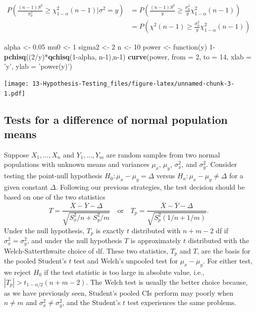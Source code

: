 \documentclass[]{book}
\newenvironment{Shaded}{\begin{snugshade}}{\end{snugshade}}
\newcommand{\KeywordTok}[1]{\textcolor[rgb]{0.13,0.29,0.53}{\textbf{{#1}}}}
\newcommand{\DataTypeTok}[1]{\textcolor[rgb]{0.13,0.29,0.53}{{#1}}}
\newcommand{\DecValTok}[1]{\textcolor[rgb]{0.00,0.00,0.81}{{#1}}}
\newcommand{\FloatTok}[1]{\textcolor[rgb]{0.00,0.00,0.81}{{#1}}}
\newcommand{\StringTok}[1]{\textcolor[rgb]{0.31,0.60,0.02}{{#1}}}
\newcommand{\NormalTok}[1]{{#1}}
\begin{document}
\begin{align*}
P\left(\frac{(n-1)S^2}{\sigma_0^2} \geq  \chi^2_{1-\alpha}(n-1)|\sigma^2 = y\right) & = P\left(\frac{(n-1)S^2}{y} \geq  \frac{\sigma_0^2}{y}\chi^2_{1-\alpha}(n-1)\right)\\
& = P\left(\chi^2(n-1) \geq  \frac{\sigma_0^2}{y}\chi^2_{1-\alpha}(n-1)\right)
\end{align*}

\begin{Shaded}
\begin{Highlighting}[]
\NormalTok{alpha <-}\StringTok{ }\FloatTok{0.05}
\NormalTok{mu0 <-}\StringTok{ }\DecValTok{1}
\NormalTok{sigma2 <-}\StringTok{ }\DecValTok{2}
\NormalTok{n <-}\StringTok{ }\DecValTok{10}
\NormalTok{power <-}\StringTok{ }\NormalTok{function(y)  }\DecValTok{1}\NormalTok{-}\KeywordTok{pchisq}\NormalTok{((}\DecValTok{2}\NormalTok{/y)*}\KeywordTok{qchisq}\NormalTok{(}\DecValTok{1}\NormalTok{-alpha, n}\DecValTok{-1}\NormalTok{),n}\DecValTok{-1}\NormalTok{)}
\KeywordTok{curve}\NormalTok{(power, }\DataTypeTok{from =} \DecValTok{2}\NormalTok{, }\DataTypeTok{to =} \DecValTok{14}\NormalTok{, }\DataTypeTok{xlab =} \StringTok{'y'}\NormalTok{, }\DataTypeTok{ylab =} \StringTok{'power(y)'}\NormalTok{)  }
\end{Highlighting}
\end{Shaded}

\texttt{[image: 13-Hypothesis-Testing\_files/figure-latex/unnamed-chunk-3-1.pdf]}

\subsection{Tests for a difference of normal population
means}\label{tests-for-a-difference-of-normal-population-means}

Suppose \(X_1, \ldots, X_n\) and \(Y_1, \ldots, Y_m\) are random samples
from two normal populations with unknown means and variances \(\mu_x\),
\(\mu_y\), \(\sigma_x^2\), and \(\sigma_y^2\). Consider testing the
point-null hypothesis \(H_0:\mu_x - \mu_y = \Delta\) versus
\(H_a:\mu_x - \mu_y \ne \Delta\) for a given constant \(\Delta\).
Following our previous strategies, the test decision should be based on
one of the two statistics
\[T = \frac{\overline X - \overline Y - \Delta}{\sqrt{S_x^2/n + S_y^2/m}} \quad \text{or}\quad T_p = \frac{\overline X - \overline Y - \Delta}{\sqrt{S_p^2\left(1/n+1/m\right)}}.\]
Under the null hypothesis, \(T_p\) is exactly \(t\) distributed with
\(n+m-2\) df if \(\sigma_x^2 = \sigma_y^2\), and under the null
hypothesis \(T\) is approximately \(t\) distributed with the
Welch-Satterthwaite choice of df. These two statistics, \(T_p\) and
\(T\), are the basis for the pooled Student's \(t\) test and Welch's
unpooled test for \(\mu_x - \mu_y\). For either test, we reject \(H_0\)
if the test statistic is too large in absolute value, i.e.,
\(|T_p|>t_{1-\alpha/2}(n+m-2)\). The Welch test is usually the better
choice because, as we have previously seen, Student's pooled CIs perform
may poorly when \(n\ne m\) and \(\sigma_x^2 \ne \sigma_y^2\), and the
Student's \(t\) test experiences the same problems.
\end{document}
